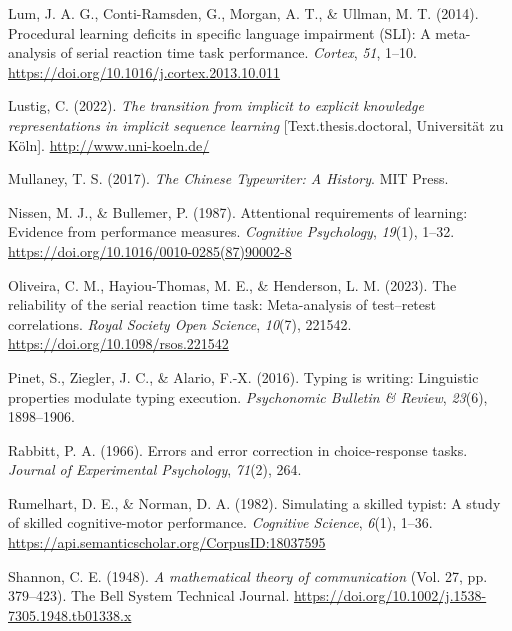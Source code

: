 \documentclass[
  10pt,
  letterpaper]{article}
\newlength{\cslhangindent}
\newenvironment{CSLReferences}[2] %
 {\begin{list}{}{%
  \setlength{\itemindent}{0pt}
  \setlength{\leftmargin}{0pt}
  \setlength{\parsep}{0pt}
  \ifodd #1
   \setlength{\leftmargin}{\cslhangindent}
   \setlength{\itemindent}{-1\cslhangindent}
  \fi
  \setlength{\itemsep}{#2\baselineskip}}}
 {\end{list}}
\begin{document}
\begin{CSLReferences}{1}{0}
Lum, J. A. G., Conti-Ramsden, G., Morgan, A. T., \& Ullman, M. T.
(2014). Procedural learning deficits in specific language impairment
({SLI}): {A} meta-analysis of serial reaction time task performance.
\emph{Cortex}, \emph{51}, 1--10.
\url{https://doi.org/10.1016/j.cortex.2013.10.011}

Lustig, C. (2022). \emph{The transition from implicit to explicit
knowledge representations in implicit sequence learning}
{[}Text.thesis.doctoral, Universität zu Köln{]}.
\url{http://www.uni-koeln.de/}

Mullaney, T. S. (2017). \emph{The {Chinese} {Typewriter}: {A}
{History}}. MIT Press.

Nissen, M. J., \& Bullemer, P. (1987). Attentional requirements of
learning: {Evidence} from performance measures. \emph{Cognitive
Psychology}, \emph{19}(1), 1--32.
\url{https://doi.org/10.1016/0010-0285(87)90002-8}

Oliveira, C. M., Hayiou-Thomas, M. E., \& Henderson, L. M. (2023). The
reliability of the serial reaction time task: Meta-analysis of
test--retest correlations. \emph{Royal Society Open Science},
\emph{10}(7), 221542. \url{https://doi.org/10.1098/rsos.221542}

Pinet, S., Ziegler, J. C., \& Alario, F.-X. (2016). Typing is writing:
Linguistic properties modulate typing execution. \emph{Psychonomic
Bulletin \& Review}, \emph{23}(6), 1898--1906.

Rabbitt, P. A. (1966). Errors and error correction in choice-response
tasks. \emph{Journal of Experimental Psychology}, \emph{71}(2), 264.

Rumelhart, D. E., \& Norman, D. A. (1982). Simulating a skilled typist:
A study of skilled cognitive-motor performance. \emph{Cognitive
Science}, \emph{6}(1), 1--36.
\url{https://api.semanticscholar.org/CorpusID:18037595}

Shannon, C. E. (1948). \emph{A mathematical theory of communication}
(Vol. 27, pp. 379--423). The Bell System Technical Journal.
\url{https://doi.org/10.1002/j.1538-7305.1948.tb01338.x}


\end{CSLReferences}
\end{document}

